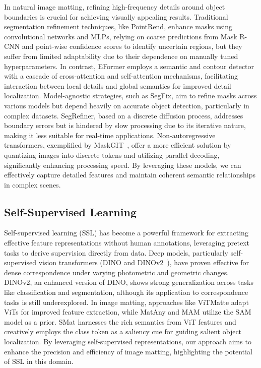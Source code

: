 In natural image matting, refining high-frequency details around object boundaries is crucial for achieving visually appealing results. Traditional segmentation refinement techniques, like PointRend, enhance masks using convolutional networks and MLPs, relying on coarse predictions from Mask R-CNN and point-wise confidence scores to identify uncertain regions, but they suffer from limited adaptability due to their dependence on manually tuned hyperparameters. In contrast, EFormer employs a semantic and contour detector with a cascade of cross-attention and self-attention mechanisms, facilitating interaction between local details and global semantics for improved detail localization. Model-agnostic strategies, such as SegFix, aim to refine masks across various models but depend heavily on accurate object detection, particularly in complex datasets. SegRefiner, based on a discrete diffusion process, addresses boundary errors but is hindered by slow processing due to its iterative nature, making it less suitable for real-time applications. Non-autoregressive transformers, exemplified by MaskGIT~\cite{maskgit}, offer a more efficient solution by quantizing images into discrete tokens and utilizing parallel decoding, significantly enhancing processing speed. By leveraging these models, we can effectively capture detailed features and maintain coherent semantic relationships in complex scenes.

\subsection{Self-Supervised Learning}
Self-supervised learning (SSL) has become a powerful framework for extracting effective feature representations without human annotations, leveraging pretext tasks to derive supervision directly from data. Deep models, particularly self-supervised vision transformers (DINO and DINOv2~\cite{DINOv2}), have proven effective for dense correspondence under varying photometric and geometric changes. DINOv2, an enhanced version of DINO, shows strong generalization across tasks like classification and segmentation, although its application to correspondence tasks is still underexplored. In image matting, approaches like ViTMatte\cite{Yao2024vitmatte} adapt ViTs for improved feature extraction, while MatAny and MAM utilize the SAM model as a prior. SMat harnesses the rich semantics from ViT features and creatively employs the class token as a saliency cue for guiding salient object localization. By leveraging self-supervised representations, our approach aims to enhance the precision and efficiency of image matting, highlighting the potential of SSL in this domain.

